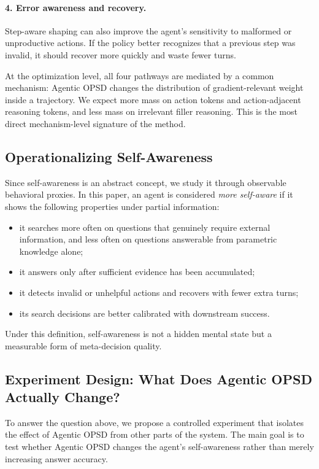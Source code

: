 \documentclass[11pt]{article}
\newcommand{\method}{Agentic OPSD}
\begin{document}
\paragraph{4. Error awareness and recovery.}
Step-aware shaping can also improve the agent's sensitivity to malformed or unproductive actions. If the policy better recognizes that a previous step was invalid, it should recover more quickly and waste fewer turns.

At the optimization level, all four pathways are mediated by a common mechanism: \method{} changes the distribution of gradient-relevant weight inside a trajectory. We expect more mass on action tokens and action-adjacent reasoning tokens, and less mass on irrelevant filler reasoning. This is the most direct mechanism-level signature of the method.

\subsection{Operationalizing Self-Awareness}
Since self-awareness is an abstract concept, we study it through observable behavioral proxies. In this paper, an agent is considered \emph{more self-aware} if it shows the following properties under partial information:
\begin{itemize}[leftmargin=1.5em]
    \item it searches more often on questions that genuinely require external information, and less often on questions answerable from parametric knowledge alone;
    \item it answers only after sufficient evidence has been accumulated;
    \item it detects invalid or unhelpful actions and recovers with fewer extra turns;
    \item its search decisions are better calibrated with downstream success.
\end{itemize}
Under this definition, self-awareness is not a hidden mental state but a measurable form of meta-decision quality.

\subsection{Experiment Design: What Does Agentic OPSD Actually Change?}
To answer the question above, we propose a controlled experiment that isolates the effect of \method{} from other parts of the system. The main goal is to test whether Agentic OPSD changes the agent's self-awareness rather than merely increasing answer accuracy.
\end{document}
